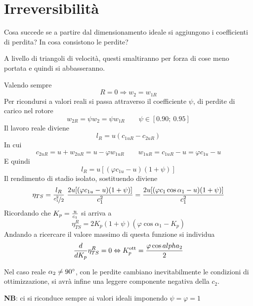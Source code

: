 \documentclass[a4paper, 15pt]{article}
\begin{document}
\newpage

\section{Irreversibilità}
\begin{adjustwidth}{2in}{}	
	Cosa succede se a partire dal dimensionamento ideale si aggiungono i coefficienti di perdita? In cosa consistono le perdite? 
	
	A livello di triangoli di velocità, questi smaltiranno per forza di cose meno portata e quindi si abbasseranno. \newline 
	
	Valendo sempre 
	\[R=0\Rightarrow w_2 = w_{1R}\]
	Per ricondursi a valori reali si passa attraverso il coefficiente $\psi$, di perdite di carico nel rotore
	\[w_{2R} = \psi w_2 = \psi  w_{1R}\qquad\psi\in[0.90;~0.95]\]
	Il lavoro reale diviene 
	\[l_R = u(c_{1uR}-c_{2uR})\]
	In cui
	\[c_{2uR} = u + w_{2uR} = u - \varphi w_{1uR} \qquad w_{1uR} = c_{1uR} - u = \varphi c_{1u} -u  \]
	E quindi
	\begin{equation}\label{eq:30}
		\boxed{l_R = u[(\varphi c_{1u} -u)(1+\psi)]}
	\end{equation}
	Il rendimento di stadio isolato, sostituendo diviene 
	\[\eta_{TS} = \dfrac{{l_R}}{\nicefrac{c_1^2}{2}} \ \dfrac{2u[(\varphi c_{1u} -u)(1+\psi)]}{c_1^2} = \dfrac{2u[(\varphi c_1\cos\alpha_1 -u)(1+\psi)]}{c_1^2}\]
	Ricordando che $K_p = {u\over c_1}$ si arriva a 
	\begin{equation}\label{eq:31}
		\boxed{\eta^R_{TS} = 2K_p(1+\psi)(\varphi\cos\alpha_1-K_p)}
	\end{equation}
	Andando a ricercare il valore massimo di questa funzione si individua 
	\[{d\over d K_p}\eta^R_{TS} = 0 \Leftrightarrow K_p^{\text{ott}}=\dfrac{\varphi\cos
	alpha_2}{2}\]
	
	Nel caso reale $\alpha_2\ne90\degree$, con le perdite cambiano inevitabilmente le condizioni di ottimizzazione, si avrà infine una leggere componente negativa della $c_2$. \newline
	
	\textbf{NB}: ci si riconduce sempre ai valori ideali imponendo $\psi=\varphi=1$ 
\end{adjustwidth}
\end{document}
